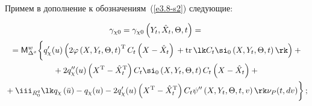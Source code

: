 Примем в дополнение к обозначениям~(\ref{e3.8-s2}) следующие:

\begin{multline*}

    \gamma_{\chi 0}=

    \gamma_{\chi 0} \left(Y_t,\hat X_t,\Theta, t\right) ={}\\

    {}=

    {\sf M}_{\Delta^x}^{w} \bigg\{ 


    q_\chi'(u) \left(2\varphi 

    \left(X,Y_t,\Theta,t\right)^{\mathrm{T}} C_t\left(X-\hat X_t\right) %

    {}+ \mathrm{tr}\, 

    \lk C_t\si_0 \left(X,Y_t,\Theta,t\right)\rk \right)+{}\\

{}+ 2q_\chi'' (u)\left(X^{\mathrm{T}}-\hat X_t^{\mathrm{T}}\right) C_t\si_0 \left(X,Y_t,\Theta,t\right)

    C_t\left(X-\hat X_t\right)+{}\\

{}+\iii_{R_0^q} \lk q_\chi \left(\bar u\right) -q_\chi (u) - 2

    q_\chi' (u) \left(X^{\mathrm{T}}-\hat X_t^{\mathrm{T}}\right) 

    C_t\psi'' \left(X,Y_t,\Theta,t,v\right)\rk \nu_P (t,dv)\bigg\}\,;


    \end{multline*}

    

    \vspace*{-12pt}

    

    \noindent

